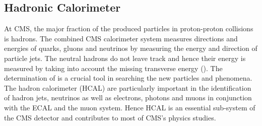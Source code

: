 \subsection{Hadronic Calorimeter}
At CMS, the major fraction of the produced particles in proton-proton collisions is hadrons. The combined CMS calorimeter system measures directions and energies of quarks, gluons and neutrinos by measuring the energy and direction of particle jets. The neutral hadrons do not leave track and hence their energy is measured by taking into account the missing transverse energy (\ETmiss). The determination of \ETmiss is a crucial tool in searching the new particles and phenomena. The hadron calorimeter (HCAL) are particularly important in the identification of hadron jets, neutrinos as well as electrons, photons and muons in conjunction with the ECAL and the muon system. Hence HCAL is an essential sub-system of the CMS detector and contributes to most of CMS's physics studies.

